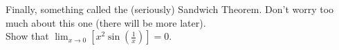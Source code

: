 \documentclass[11pt]{article}
\begin{document}
    \vspace{1ex}

    \noindent Finally, something called the (seriously) Sandwich Theorem. Don't worry too much about this one (there will be more later).\\[3ex]
    \noindent Show that $\displaystyle \lim_{x\to0}\left[x^2\sin\!\left(\frac{1}{x}\right)\right]=0$.
\end{document}
